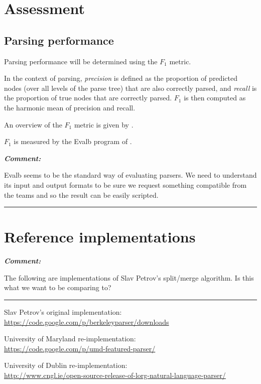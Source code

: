 \documentclass[english]{article}
\renewenvironment{comment}
    {%
     \par\medskip\noindent
     \tabularx{\textwidth}{|>{\columncolor[gray]{0.9}}X|}
     \hline
     \emph{\textbf{Comment:}}%
    }
    {%
     \endtabularx\hrule\par\medskip
    }
\begin{document}
\section{Assessment}


\subsection{Parsing performance}

Parsing performance will be determined using the $F_{1}$ metric. 

In the context of parsing, \emph{precision} is defined as the proportion of predicted nodes (over all levels of the parse tree) that are also correctly parsed, and \emph{recall} is the proportion of true nodes that are correctly parsed. $F_{1}$ is then computed as the harmonic mean of precision and recall.

An overview of the $F_{1}$ metric is given by \citet{Manning2012a}.

$F_{1}$ is measured by the Evalb program of \citet{Sekine1997}.

\begin{comment}
Evalb seems to be the standard way of evaluating parsers. We need to understand its input and output formats to be sure we request something compatible from the teams and so the result can be easily scripted.
\end{comment}



\section{Reference implementations}

\begin{comment}
The following are implementations of Slav Petrov's split/merge algorithm. Is this what we want to be comparing to? 
\end{comment}


Slav Petrov's original implementation: \\
\url{https://code.google.com/p/berkeleyparser/downloads}

University of Maryland re-implementation: \\
\url{https://code.google.com/p/umd-featured-parser/}

University of Dublin re-implementation: \\
\url{http://www.cngl.ie/open-source-release-of-lorg-natural-language-parser/}


\end{document}
